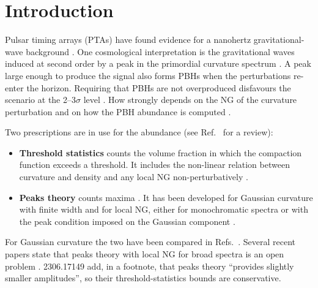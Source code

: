 \documentclass[11pt,a4paper]{article}
\begin{document}
\section{Introduction}

Pulsar timing arrays (PTAs) have found evidence for a nanohertz gravitational-wave background
\cite{NG15gwb,EPTA23,PPTA23,CPTA23}. One cosmological interpretation is the gravitational waves
induced at second order by a peak in the primordial curvature spectrum
\cite{Ananda,Baumann,Kohri,Domenech,NG15np,FPRS23,Ellis23}. A peak large enough to produce the
signal also forms PBHs when the perturbations re-enter the horizon. Requiring that PBHs are not
overproduced disfavours the scenario at the 2--3$\sigma$ level \cite{FIVT23,NG15np,Iovino24}. How
strongly depends on the NG of the curvature perturbation \cite{FIVT23,LCH23,WZLZ23} and on how the
PBH abundance is computed \cite{Iovino24}.

Two prescriptions are in use for the abundance (see Ref.~\cite{CIPVV26} for a review):
\begin{itemize}
\item \textbf{Threshold statistics} counts the volume fraction in which the compaction function
\cite{SS99,Harada15} exceeds a threshold. It includes the non-linear relation between curvature
and density \cite{Young19,DeLuca19} and any local NG non-perturbatively \cite{Ferrante,Ianniccari}.
\item \textbf{Peaks theory} counts maxima \cite{BBKS,Yoo18}. It has been developed for Gaussian
curvature with finite width \cite{Yoo20,GS20,Pi25,Kushwaha,ColeFumagalli} and for local NG, either
for monochromatic spectra \cite{Young22,Kitajima,Inui} or with the peak condition imposed on the
Gaussian component \cite{AGM19,YGY19,Riccardi}.
\end{itemize}
For Gaussian curvature the two have been compared in Refs.~\cite{Gow21,Ianniccari,Kushwaha,Iovino24}.
Several recent papers state that peaks theory with local NG for broad spectra is an open problem
\cite{Ianniccari,Iovino24,IPV25,Pi25,ColeFumagalli,GTV25}. 2306.17149 \cite{FIVT23} add, in a
footnote, that peaks theory ``provides slightly smaller amplitudes'', so their threshold-statistics
bounds are conservative.
\end{document}
